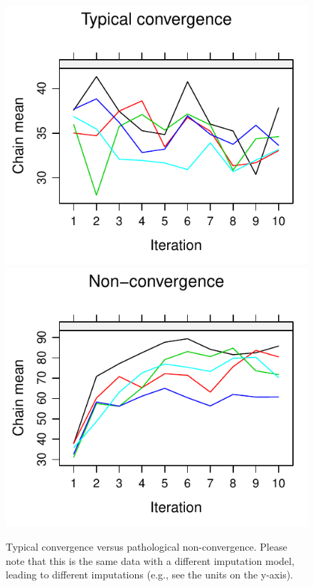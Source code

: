 \documentclass[Royal,times,sageh]{sagej}
\begin{document}
\begin{figure}

{\centering \includegraphics[width=.49\linewidth]{manuscript_files/figure-latex/non-conv-1} \includegraphics[width=.49\linewidth]{manuscript_files/figure-latex/non-conv-2} 

}

\caption{Typical convergence versus pathological non-convergence. Please note that this is the same data with a different imputation model, leading to different imputations (e.g., see the units on the y-axis).}\label{fig:non-conv}
\end{figure}
\end{document}
